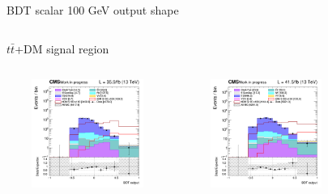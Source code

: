 \documentclass[8pt]{beamer}
\begin{document}
\begin{frame}{BDT scalar 100 GeV output shape}
\vspace{-8pt}
\begin{columns}
\begin{column}{1.09\textwidth}
\begin{block}{\centering $t \bar t$+DM signal region}\end{block} \vspace{10pt}
\end{column}
\end{columns} \vspace{-16pt}
\begin{columns}
		\begin{column}{0.33\textwidth}
			\begin{center}
     			\includegraphics[width=1.0\textwidth, height=100pt]{figs/2016/SmearSR-ttDM-scalar100/log_cratio_TTbar_topCR_ll_BDT_ttDM100_TTbar_BDT_output_scalar100_customBinsAttempt7.png}
    		\end{center}		
		\end{column}
		\begin{column}{0.33\textwidth}
			\begin{center}
     			\includegraphics[width=1.0\textwidth, height=100pt]{figs/2017/SmearSR-ttDM-scalar100/log_cratio_TTbar_topCR_ll_BDT_ttDM100_TTbar_BDT_output_scalar100_customBinsAttempt7.png}
    		\end{center}		
		\end{column}
		\begin{column}{0.33\textwidth}
			\begin{center}

\end{center}
\end{column}
\end{columns}
\end{frame}
\end{document}
